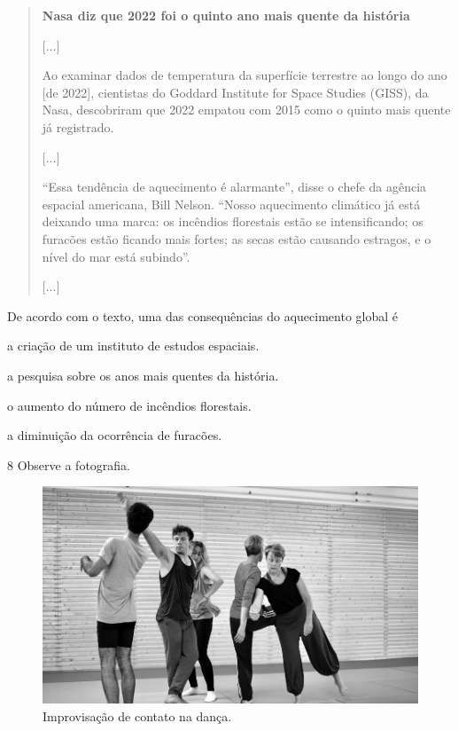 \begin{quote}
\textbf{Nasa diz que 2022 foi o quinto ano mais quente da história}

{[}...{]}

Ao examinar dados de temperatura da superfície terrestre ao longo do ano
[de 2022], cientistas do Goddard Institute for Space Studies (GISS), da
Nasa, descobriram que 2022 empatou com 2015 como o quinto mais quente já
registrado.

{[}...{]}

“Essa tendência de aquecimento é alarmante”, disse o chefe da agência
espacial americana, Bill Nelson. “Nosso aquecimento climático já está
deixando uma marca: os incêndios florestais estão se intensificando; os
furacões estão ficando mais fortes; as secas estão causando estragos, e
o nível do mar está subindo”.

{[}...{]}

\end{quote}

De acordo com o texto, uma das consequências do aquecimento global é

\begin{escolha}
\item a criação de um instituto de estudos espaciais.

\item a pesquisa sobre os anos mais quentes da história.

\item o aumento do número de incêndios florestais.

\item a diminuição da ocorrência de furacões.
\end{escolha}


\num{8}  Observe a fotografia.

\begin{figure}[htpb!]
\includegraphics[width=\textwidth]{./imgs/art39.png}
\caption{Improvisação de contato na dança.}
\end{figure}

